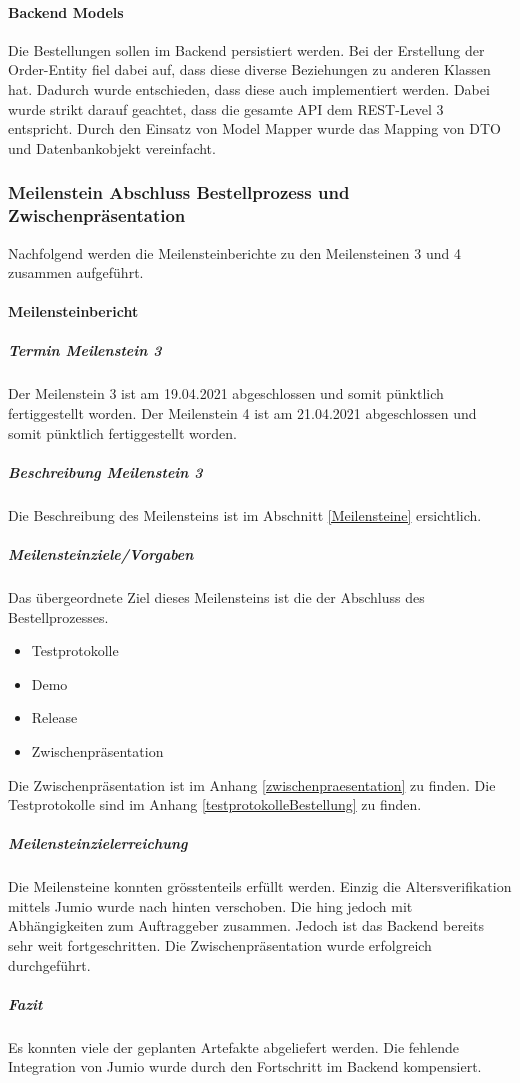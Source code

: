 \paragraph{Backend Models}
Die Bestellungen sollen im Backend persistiert werden. Bei der Erstellung der Order-Entity fiel dabei auf, dass diese diverse Beziehungen zu anderen Klassen hat. Dadurch wurde entschieden, dass diese auch implementiert werden. 
Dabei wurde strikt darauf geachtet, dass die gesamte API dem REST-Level 3 entspricht. Durch den Einsatz von Model Mapper wurde das Mapping von DTO und Datenbankobjekt vereinfacht. 


\subsubsection{Meilenstein Abschluss Bestellprozess und Zwischenpräsentation}
Nachfolgend werden die Meilensteinberichte zu den Meilensteinen 3 und 4 zusammen aufgeführt. 
 \paragraph{Meilensteinbericht}
 \subparagraph{Termin Meilenstein 3}
 Der Meilenstein 3 ist am 19.04.2021 abgeschlossen und somit pünktlich fertiggestellt worden.
 Der Meilenstein 4 ist am 21.04.2021 abgeschlossen und somit pünktlich fertiggestellt worden. 
 \subparagraph{Beschreibung Meilenstein 3}
 Die Beschreibung des Meilensteins ist im Abschnitt \ref{Meilensteine} ersichtlich. 
 \subparagraph{Meilensteinziele/Vorgaben}
Das übergeordnete Ziel dieses Meilensteins ist die der Abschluss des Bestellprozesses. 
 \begin{itemize}
 	\item Testprotokolle
 	\item Demo
 	\item Release 
 	\item Zwischenpräsentation
 \end{itemize}
Die Zwischenpräsentation ist im Anhang \ref{zwischenpraesentation} zu finden. 
Die Testprotokolle sind im Anhang \ref{testprotokolleBestellung} zu finden. 
 \subparagraph{Meilensteinzielerreichung}
Die Meilensteine konnten grösstenteils erfüllt werden. Einzig die Altersverifikation mittels Jumio wurde nach hinten verschoben. Die hing jedoch mit Abhängigkeiten zum Auftraggeber zusammen. Jedoch ist das Backend bereits sehr weit fortgeschritten.  
Die Zwischenpräsentation wurde erfolgreich durchgeführt. 
 \subparagraph{Fazit}
Es konnten viele der geplanten Artefakte abgeliefert werden. Die fehlende Integration von Jumio wurde durch den Fortschritt im Backend kompensiert. 

